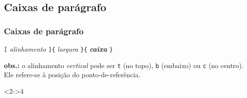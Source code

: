 \documentclass[handout,10pt]{beamer}
\begin{document}
\newlength{\myparboxBheight}
\settoheight{\myparboxBheight}{\usebox{\myparboxB}}

\newlength{\tinybaselineskip}
\tiny\setlength{\tinybaselineskip}{1.5ex}

\normalsize

\subsection{Caixas de parágrafo}
\begin{frame}[fragile]
	\frametitle{Caixas de parágrafo}
	
	\begin{block}{}
		\centering
		\verb|[|%
			\textit{alinhamento}%
		\verb|]{|%
			\textit{largura}%
		\verb|}{|%
			\textit{\textbf{caixa}}%
		\verb|}|
	\end{block}
	
	\smallskip
	
	{
	\scriptsize\textbf{obs.:} o alinhamento \emph{vertical} pode ser \texttt{t}
	(no	topo), \texttt{b} (embaixo) ou \texttt{c} (no centro). Ele refere-se à
	posição do ponto-de-referência.
	
	}
		
	\vfill
	
	\begin{atividade}<2->{4}
	
		\smallskip
	
		\tiny
		\noindent\rule[-\myparboxBheight]{0pt}{2\myparboxBheight}\hrulefill
		\ifhandout\else\onslide<3->{\llap{\usebox{\myparboxA}}}\fi%
		\hrulefill
		\onslide<2,3>{\raisebox{-\myparboxBheight+\tinybaselineskip}
			{\usebox{\myparboxB}}}%
		\ifhandout\else\onslide<4->{\llap{\raisebox{-0.5\myparboxBheight}{\usebox{\myparboxB}}}}\fi
		\hrulefill
	\end{atividade}
		
\end{frame}
\newsavebox{\myminipageA}
\end{document}
